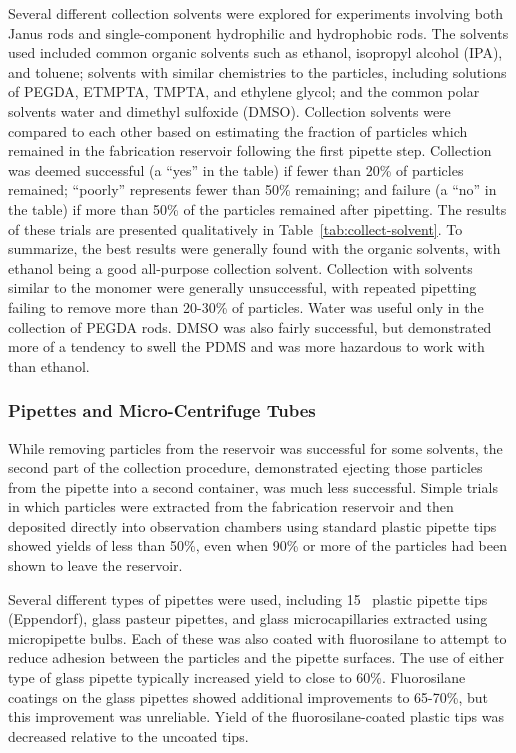 Several different collection solvents were explored for experiments involving both Janus rods and single-component
hydrophilic and hydrophobic rods.  The solvents used included 
common organic solvents such as ethanol,
isopropyl alcohol (IPA), and toluene; solvents with similar chemistries to the particles, including solutions of 
PEGDA, ETMPTA, TMPTA, and ethylene glycol; and the common polar solvents water and dimethyl sulfoxide (DMSO).
Collection solvents were compared to each other based on estimating the fraction of particles which remained in the
fabrication reservoir following the first pipette step.  Collection was deemed successful (a 
``yes'' in the table) if fewer than 20\% of particles remained; ``poorly'' represents fewer than 50\% remaining; and 
failure (a ``no'' in the table) if more than 50\% of the particles remained after pipetting.
The results of these trials are presented qualitatively in Table~\ref{tab:collect-solvent}.  To summarize, the best
results were generally found with the organic solvents, with ethanol being a good all-purpose collection solvent.
Collection with solvents similar to the monomer were generally unsuccessful, with repeated pipetting failing to 
remove more than 20-30\% of particles.  Water was useful only in the collection of PEGDA rods.
DMSO was also fairly successful, but demonstrated more of a tendency to swell the PDMS
and was more hazardous to work with than ethanol.

\subsubsection{Pipettes and Micro-Centrifuge Tubes}

While removing particles from the reservoir was successful for some solvents, the second part of the collection 
procedure, demonstrated ejecting those particles from the pipette into a second container, was much less successful.  
Simple trials in which particles were extracted from the fabrication reservoir and then deposited directly into 
observation chambers using standard plastic pipette tips showed yields of less than 50\%, 
even when 90\% or more of the particles had been shown to leave the reservoir.  


Several different types of pipettes were used, including 15 \uL~plastic pipette tips (Eppendorf), glass pasteur pipettes,
and
glass microcapillaries extracted using micropipette bulbs.  Each of these 
was also coated with fluorosilane to attempt to reduce adhesion between the particles and the pipette surfaces.
The use of either type of glass pipette typically increased yield to close to 60\%. Fluorosilane coatings on the glass
pipettes showed additional improvements to 65-70\%, but this improvement was unreliable.  Yield of the 
fluorosilane-coated plastic tips was decreased relative to the uncoated tips.

